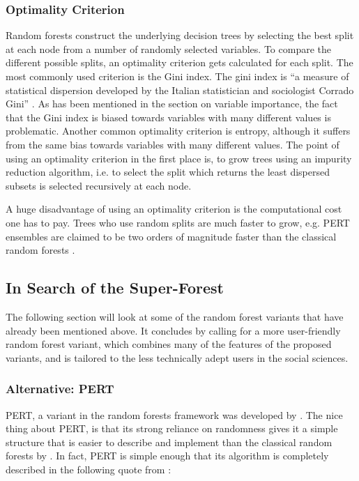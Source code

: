\documentclass[a4paper,man,12pt,apacite,floatsintext,draftfirst]{apa6} %
\begin{document}
\subsubsection{Optimality Criterion}
Random forests construct the underlying decision trees by selecting the
best split at each node from a number of randomly selected variables.
To compare the different possible splits, an optimality criterion gets
calculated for each split.
The most commonly used criterion is the Gini index.
The gini index is “a measure of statistical dispersion developed by the
Italian statistician and sociologist Corrado Gini” \cite{wpGINI}.
As has been mentioned in the section on variable importance, the fact that
the Gini index is biased towards variables with many different values
is problematic.
Another common optimality criterion is entropy, although it suffers from
the same bias towards variables with many different values.
The point of using an optimality criterion in the first place is,
to grow trees using an impurity reduction algorithm, i.e. to select the split
which returns the least dispersed subsets is selected recursively at each node.

A huge disadvantage of using an optimality criterion is the computational cost
one has to pay.
Trees who use random splits are much faster to grow, e.g. PERT ensembles
are claimed to be two orders of magnitude faster than the classical
random forests \cite{cutler2001pert}.

\subsection{In Search of the Super-Forest}
The following section will look at some of the random forest variants that
have already been mentioned above. It concludes by calling for a more
user-friendly random forest variant, which combines many of the features of
the proposed variants, and is tailored to the less technically adept users
in the social sciences.

\subsubsection{Alternative: PERT}
PERT, a variant in the random forests framework was developed
by \cite{cutler2001pert}.
The nice thing about PERT, is that its strong reliance on randomness gives
it a simple structure that is easier to describe and implement than the
classical random forests by \cite{breiman2001random}.
In fact, PERT is simple enough that its algorithm is completely described
in the following quote from \cite{cutler2001pert}:
\end{document}
